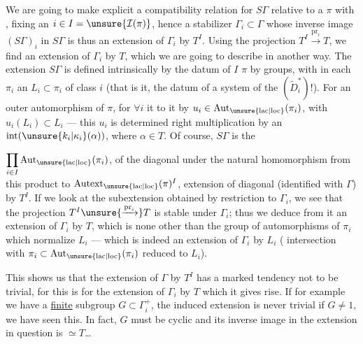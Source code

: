 
We are going to make explicit a compatibility
relation for $S\Gamma$ relative to a $\pi$
with , fixing an $i\in I=\unsure{\mathcal I(\pi)}$,
hence a stabilizer $\Gamma_i\subset\Gamma$ whose inverse
image $(S\Gamma)_i$ in $S\Gamma$ is thus an
extension of $\Gamma_i$ by $T^I$. Using the
projection $T^I\xrightarrow{\mathrm{pr}_i}T$, we find an
extension of $\Gamma_i$ by $T$, which we are going to describe
in another way. The extension $S\Gamma$
is defined intrinsically by the
datum of $I$   
 $\pi$ by groups, with in
each $\pi_i$ an $L_i\subset\pi_i$ of class $i$
(that is it, the datum of a system of the
$(\widetilde D_i^*)$!). For an outer automorphism   of $\pi$,
for $\forall i$ it   to
 it by $u_i\in\operatorname{Aut}_{\unsure{\mathrm{lac}|\mathrm{loc}}}(\pi_i)$, with $u_i(L_i)\subset L_i$
--- this $u_i$ is determined  right
multiplication by an $\operatorname{int}(\unsure{k_i|\kappa_i}(\alpha))$, where $\alpha\in T$.
Of course, $S\Gamma$ is the  

$\displaystyle\prod_{i\in I}\operatorname{Aut}_{\unsure{\mathrm{lac}|\mathrm{loc}}}(\pi_i)$,
  of the diagonal
under the natural homomorphism from this product to
$\operatorname{Autext}_{\unsure{\mathrm{lac}|\mathrm{loc}}}(\pi)^I$,   extension of
 diagonal (identified with $\Gamma$) by $T^I$.
If we look at the subextension  obtained
by restriction to $\Gamma_i$, we see that the
projection $T^I\unsure{\xrightarrow{\mathrm{pr}_i}}T$ is stable under $\Gamma_i$; thus
we deduce from it an extension of $\Gamma_i$ by $T$,
which is none other than the group of
automorphisms  of $\pi_i$ which normalize $L_i$
--- which is indeed an extension of $\Gamma_i$ by $L_i$
( intersection with $\pi_i\subset\operatorname{Aut}_{\unsure{\mathrm{lac}|\mathrm{loc}}}(\pi_i)$ 
reduced to $L_i$).

This shows us that the extension
of $\Gamma$ by $T^I$ has a marked tendency
not to be trivial, for this is 
 for the extension of $\Gamma_i$ by $T$  which it gives
rise. If for example we have a
\uline{finite} subgroup $G\subset\Gamma_i^+$, the induced extension is
never trivial if $G\ne1$, we have seen this. In
fact, $G$ must be cyclic and its inverse image
in the extension in question is $\simeq T$\ldots
{}

